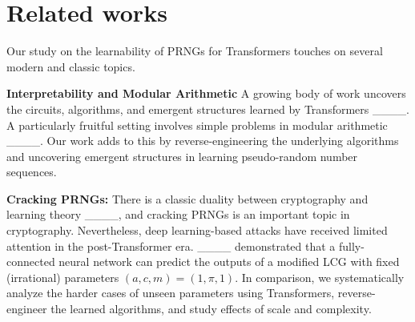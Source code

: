 \section{Related works}
Our study on the learnability of PRNGs for Transformers touches on several modern and classic topics. 



\textbf{Interpretability and Modular Arithmetic} A growing body of work uncovers the circuits, algorithms, and emergent structures learned by Transformers ____. A particularly fruitful setting involves simple problems in modular arithmetic ____.
Our work adds to this by reverse-engineering the underlying algorithms and uncovering emergent structures in learning pseudo-random number sequences. 


\textbf{Cracking PRNGs:} There is a classic duality between cryptography and learning theory ____, and cracking PRNGs is an important topic in cryptography. Nevertheless, deep learning-based attacks have received limited attention in the post-Transformer era. ____ demonstrated that a fully-connected neural network can predict the outputs of a modified LCG with fixed (irrational) parameters $(a,c,m) = (1,\pi,1)$. In comparison, we systematically analyze the harder cases of unseen parameters using Transformers, reverse-engineer the learned algorithms, and study effects of scale and complexity. 

